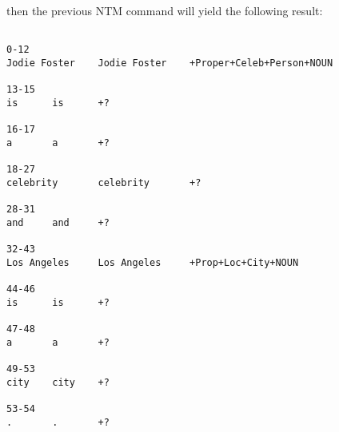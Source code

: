 \documentclass{article}
\begin{document}
then the previous NTM command will yield the following result:

\begin{verbatim}

0-12
Jodie Foster    Jodie Foster    +Proper+Celeb+Person+NOUN

13-15
is      is      +?

16-17
a       a       +?

18-27
celebrity       celebrity       +?

28-31
and     and     +?

32-43
Los Angeles     Los Angeles     +Prop+Loc+City+NOUN

44-46
is      is      +?

47-48
a       a       +?

49-53
city    city    +?

53-54
.       .       +?


\end{verbatim}
\end{document}
